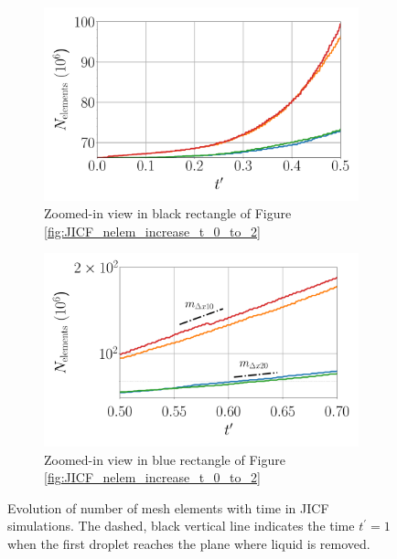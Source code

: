 \begin{figure}[ht]
\begin{subfigure}[b]{0.45\textwidth}
	\centering
   \includegraphics[scale=0.25]{./part2_developments/figures_ch5_resolved_JICF/JICF_nelem_evolution/JICF_nelem_increase_t_in_0_0p5}
   \caption{Zoomed-in view in black rectangle of Figure \ref{fig:JICF_nelem_increase_t_0_to_2}}
   \label{fig:JICF_nelem_increase_t_0_to_0p5} 
\end{subfigure}
\hfill
\begin{subfigure}[b]{0.45\textwidth}
	\centering
   \includegraphics[scale=0.25]{./part2_developments/figures_ch5_resolved_JICF/JICF_nelem_evolution/JICF_nelem_increase_t_in_0p5_1}
   \caption{Zoomed-in view in blue rectangle of Figure \ref{fig:JICF_nelem_increase_t_0_to_2}}
   \label{fig:JICF_nelem_increase_t_0p5_to_0p7}
\end{subfigure}
   \caption{Evolution of number of mesh elements with time in JICF simulations. The dashed, black vertical line indicates the time $t^\prime = 1$ when the first droplet reaches the plane where liquid is removed.}
\label{fig:JICF_nelem_increase}
\end{figure}




